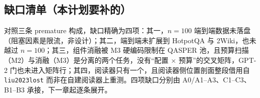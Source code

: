 \subsection{缺口清单（本计划要补的）}

对照三条 premature 构成，缺口精确为四项：其一，$n{=}100$ 端到端数据未落盘（阻塞因素是限流，非设计）；其二，端到端未扩展到 HotpotQA 与 2Wiki，也未越过 $n{=}100$；其三，组件消融被 M3 硬编码限制在 QASPER 池，且预算扫描（M2）与消融（M3）是分离的两个任务，没有``配置 $\times$ 预算''的交叉矩阵，GPT-2 门也未进入矩阵行；其四，阅读器只有一个，且阅读器侧位置剖面整段借用自 \texttt{liu2023lost} 而非在自建阅读器上重测。四项缺口分别由 A0/A1--A3、C1--C3、B1--B3 承接，下一章起逐条展开。
